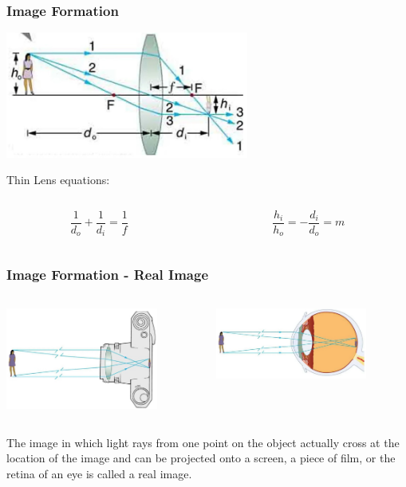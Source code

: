 \documentclass{beamer}
\begin{document}
\begin{frame}\frametitle{Image Formation}

\begin{center}
\includegraphics[width=8cm]{fig/imageform1.jpg}
\end{center}


Thin Lens equations:

\begin{columns}
\begin{column}{5.5cm}
\[ \frac{1}{d_o} + \frac{1}{d_i} = \frac{1}{f}\]
\end{column}
\begin{column}{5.5cm}
\[ \frac{h_i}{h_o} = -\frac{d_i}{d_o} = m\]
\end{column}
\end{columns}

\end{frame}


\begin{frame}\frametitle{Image Formation - Real Image}
\begin{columns}
\begin{column}{5.5cm}
\begin{center}
\includegraphics[width=5cm]{fig/imageform2.jpg}
\end{center}
\end{column}
\begin{column}{5.5cm}
\begin{center}
\includegraphics[width=5cm]{fig/imageform3.jpg}
\end{center}
\end{column}
\end{columns}

\vspace{1cm}

The image in which light rays from one point on the object actually cross at the location of the image and can be projected onto a screen, a piece of film, or the retina of an eye is called a real image.

\end{frame}
\end{document}
